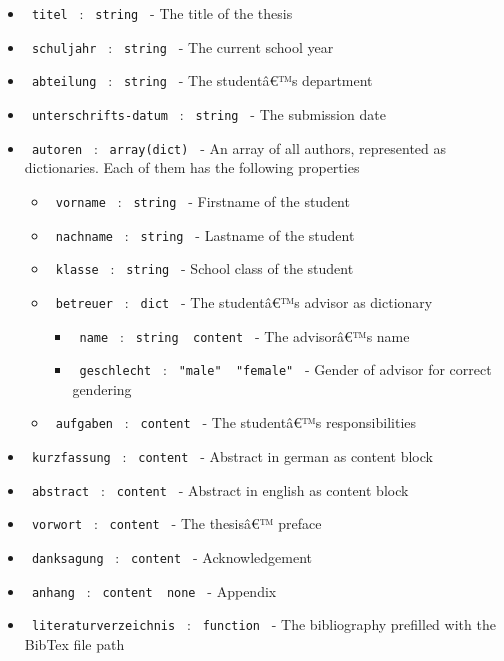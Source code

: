 \begin{itemize}
\tightlist
\item
  \texttt{\ titel\ } : \texttt{\ string\ } - The title of the thesis
\item
  \texttt{\ schuljahr\ } : \texttt{\ string\ } - The current school year
\item
  \texttt{\ abteilung\ } : \texttt{\ string\ } - The studentâ€™s
  department
\item
  \texttt{\ unterschrifts-datum\ } : \texttt{\ string\ } - The
  submission date
\item
  \texttt{\ autoren\ } : \texttt{\ array(dict)\ } - An array of all
  authors, represented as dictionaries. Each of them has the following
  properties

  \begin{itemize}
  \tightlist
  \item
    \texttt{\ vorname\ } : \texttt{\ string\ } - Firstname of the
    student
  \item
    \texttt{\ nachname\ } : \texttt{\ string\ } - Lastname of the
    student
  \item
    \texttt{\ klasse\ } : \texttt{\ string\ } - School class of the
    student
  \item
    \texttt{\ betreuer\ } : \texttt{\ dict\ } - The studentâ€™s advisor
    as dictionary

    \begin{itemize}
    \tightlist
    \item
      \texttt{\ name\ } : \texttt{\ string\ \textbar{}\ content\ } - The
      advisorâ€™s name
    \item
      \texttt{\ geschlecht\ } :
      \texttt{\ "male"\ \textbar{}\ "female"\ } - Gender of advisor for
      correct gendering
    \end{itemize}
  \item
    \texttt{\ aufgaben\ } : \texttt{\ content\ } - The studentâ€™s
    responsibilities
  \end{itemize}
\item
  \texttt{\ kurzfassung\ } : \texttt{\ content\ } - Abstract in german
  as content block
\item
  \texttt{\ abstract\ } : \texttt{\ content\ } - Abstract in english as
  content block
\item
  \texttt{\ vorwort\ } : \texttt{\ content\ } - The thesisâ€™ preface
\item
  \texttt{\ danksagung\ } : \texttt{\ content\ } - Acknowledgement
\item
  \texttt{\ anhang\ } : \texttt{\ content\ \textbar{}\ none\ } -
  Appendix
\item
  \texttt{\ literaturverzeichnis\ } : \texttt{\ function\ } - The
  bibliography prefilled with the BibTex file path
\end{itemize}

